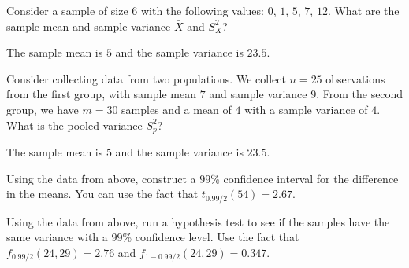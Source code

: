 
Consider a sample of size $6$ with the following values: $0$, $1$, $5$, $7$, $12$.
What are the sample mean and sample variance $\bar{X}$ and $S^2_X$?



The sample mean is $5$ and the sample variance is $23.5$.


Consider collecting data from two populations. We collect $n=25$ observations
from the first group, with sample mean $7$ and sample variance $9$. From the 
second group, we have $m=30$ samples and a mean of $4$ with a sample variance
of $4$. What is the pooled variance $S^2_p$?


The sample mean is $5$ and the sample variance is $23.5$.


Using the data from above, construct a $99$\% confidence interval for the 
difference in the means. You can use the fact that $t_{0.99/2}(54) = 2.67$. 




Using the data from above, run a hypothesis test to see if the samples have the
same variance with a $99$\% confidence level. Use the fact that
$f_{0.99/2}(24, 29) = 2.76$ and $f_{1-0.99/2}(24, 29) = 0.347$. 




